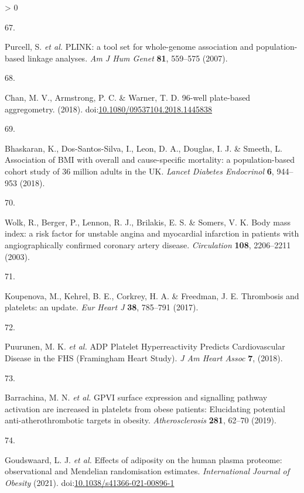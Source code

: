 \documentclass[11pt,twoside]{bristolthesis}
\newlength{\cslhangindent}
\newlength{\csllabelwidth}
\newenvironment{CSLReferences}[2] %
 {%
  \setlength{\parindent}{0pt}
  \ifodd #1 \everypar{\setlength{\hangindent}{\cslhangindent}}\ignorespaces\fi
  \ifnum #2 > 0
  \setlength{\parskip}{#2\baselineskip}
  \fi
 }%
 {}
\newcommand{\CSLLeftMargin}[1]{\parbox[t]{\csllabelwidth}{#1}}
\newcommand{\CSLRightInline}[1]{\parbox[t]{\linewidth - \csllabelwidth}{#1}\break}
\begin{document}
\begin{CSLReferences}{0}{0}
\leavevmode\hypertarget{ref-Purcell2007a}{}%
\CSLLeftMargin{67. }
\CSLRightInline{Purcell, S. \emph{et al.} {PLINK: a tool set for whole-genome association and population-based linkage analyses}. \emph{Am J Hum Genet} \textbf{81}, 559--575 (2007).}

\leavevmode\hypertarget{ref-Chan2018}{}%
\CSLLeftMargin{68. }
\CSLRightInline{Chan, M. V., Armstrong, P. C. \& Warner, T. D. 96-well plate-based aggregometry. (2018). doi:\href{https://doi.org/10.1080/09537104.2018.1445838}{10.1080/09537104.2018.1445838}}

\leavevmode\hypertarget{ref-Bhaskaran2018a}{}%
\CSLLeftMargin{69. }
\CSLRightInline{Bhaskaran, K., Dos-Santos-Silva, I., Leon, D. A., Douglas, I. J. \& Smeeth, L. {Association of BMI with overall and cause-specific mortality: a population-based cohort study of 3{{}}6 million adults in the UK}. \emph{Lancet Diabetes Endocrinol} \textbf{6}, 944--953 (2018).}

\leavevmode\hypertarget{ref-Wolk2003a}{}%
\CSLLeftMargin{70. }
\CSLRightInline{Wolk, R., Berger, P., Lennon, R. J., Brilakis, E. S. \& Somers, V. K. {Body mass index: a risk factor for unstable angina and myocardial infarction in patients with angiographically confirmed coronary artery disease}. \emph{Circulation} \textbf{108}, 2206--2211 (2003).}

\leavevmode\hypertarget{ref-Koupenova2017a}{}%
\CSLLeftMargin{71. }
\CSLRightInline{Koupenova, M., Kehrel, B. E., Corkrey, H. A. \& Freedman, J. E. {Thrombosis and platelets: an update}. \emph{Eur Heart J} \textbf{38}, 785--791 (2017).}

\leavevmode\hypertarget{ref-Puurunen2018}{}%
\CSLLeftMargin{72. }
\CSLRightInline{Puurunen, M. K. \emph{et al.} {ADP Platelet Hyperreactivity Predicts Cardiovascular Disease in the FHS (Framingham Heart Study)}. \emph{J Am Heart Assoc} \textbf{7}, (2018).}

\leavevmode\hypertarget{ref-Barrachina2019}{}%
\CSLLeftMargin{73. }
\CSLRightInline{Barrachina, M. N. \emph{et al.} {GPVI surface expression and signalling pathway activation are increased in platelets from obese patients: Elucidating potential anti-atherothrombotic targets in obesity}. \emph{Atherosclerosis} \textbf{281}, 62--70 (2019).}

\leavevmode\hypertarget{ref-Goudswaard2021}{}%
\CSLLeftMargin{74. }
\CSLRightInline{Goudswaard, L. J. \emph{et al.} {Effects of adiposity on the human plasma proteome: observational and Mendelian randomisation estimates}. \emph{International Journal of Obesity} (2021). doi:\href{https://doi.org/10.1038/s41366-021-00896-1}{10.1038/s41366-021-00896-1}}


\end{CSLReferences}
\end{document}
